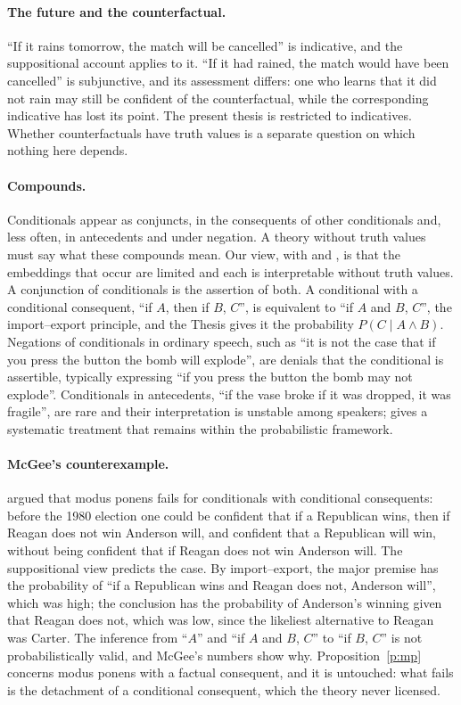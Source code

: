 \documentclass{situationist-preprint}
\begin{document}
\paragraph{The future and the counterfactual.} \enquote{If it rains tomorrow, the match will be cancelled} is indicative, and the suppositional account applies to it. \enquote{If it had rained, the match would have been cancelled} is subjunctive, and its assessment differs: one who learns that it did not rain may still be confident of the counterfactual, while the corresponding indicative has lost its point. The present thesis is restricted to indicatives. Whether counterfactuals have truth values is a separate question on which nothing here depends.

\paragraph{Compounds.} Conditionals appear as conjuncts, in the consequents of other conditionals and, less often, in antecedents and under negation. A theory without truth values must say what these compounds mean. Our view, with \citet{Edgington1995} and \citet{Bennett2003}, is that the embeddings that occur are limited and each is interpretable without truth values. A conjunction of conditionals is the assertion of both. A conditional with a conditional consequent, \enquote{if $A$, then if $B$, $C$}, is equivalent to \enquote{if $A$ and $B$, $C$}, the import--export principle, and the Thesis gives it the probability $P(C \mid A \wedge B)$. Negations of conditionals in ordinary speech, such as \enquote{it is not the case that if you press the button the bomb will explode}, are denials that the conditional is assertible, typically expressing \enquote{if you press the button the bomb may not explode}. Conditionals in antecedents, \enquote{if the vase broke if it was dropped, it was fragile}, are rare and their interpretation is unstable among speakers; \citet{McGee1989} gives a systematic treatment that remains within the probabilistic framework.

\paragraph{McGee's counterexample.} \citet{McGee1985} argued that modus ponens fails for conditionals with conditional consequents: before the 1980 election one could be confident that if a Republican wins, then if Reagan does not win Anderson will, and confident that a Republican will win, without being confident that if Reagan does not win Anderson will. The suppositional view predicts the case. By import--export, the major premise has the probability of \enquote{if a Republican wins and Reagan does not, Anderson will}, which was high; the conclusion has the probability of Anderson's winning given that Reagan does not, which was low, since the likeliest alternative to Reagan was Carter. The inference from \enquote{$A$} and \enquote{if $A$ and $B$, $C$} to \enquote{if $B$, $C$} is not probabilistically valid, and McGee's numbers show why. Proposition~\ref{p:mp} concerns modus ponens with a factual consequent, and it is untouched: what fails is the detachment of a conditional consequent, which the theory never licensed.
\end{document}

